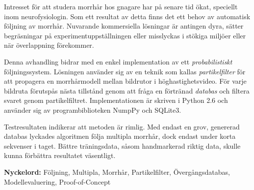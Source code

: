 
Intresset för att studera morrhår hos gnagare har på senare tid
ökat, speciellt inom neurofysiologin.  Som ett resultat av detta
finns det ett behov av automatisk följning av morrhår.  Nuvarande
kommersiella lösningar är antingen dyra, sätter
begräsningar på experimentuppställningen eller misslyckas i
stökiga miljöer eller när överlappning förekommer.

Denna avhandling bidrar med en enkel implementation av ett
\emph{probabilistiskt} följningssystem.  Lösningen använder sig av
en teknik som kallas \emph{partikelfilter} för att propagera en
morrhårmodell mellan bildrutor i höghastighetsvideo.  För varje
bildruta förutspås nästa tillstånd genom att fråga en förtränad
\emph{databas} och filtera svaret genom partikelfiltret.
Implementationen är skriven i Python 2.6 och använder sig av
programbiblioteken NumpPy och SQLite3.

Testresultaten indikerar att metoden är rimlig.  Med endast en grov,
genererad databas lyckades algoritmen följa multipla morrhår, dock
endast under korta sekvenser i taget.  Bättre träningsdata, såsom
handmarkerad riktig data, skulle kunna förbättra resultatet
väsentligt.


\textbf{Nyckelord:} Följning, Multipla, Morrhår, Partikelfilter,
Övergångsdatabas, Modellevaluering, Proof-of-Concept
